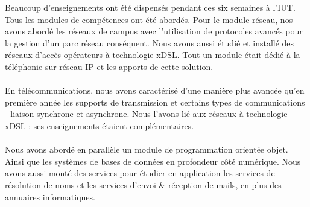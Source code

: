 \begin{resumo}
    Beaucoup d'enseignements ont été dispensés pendant ces six semaines à l'IUT. Tous les modules de compétences ont été abordés. Pour le module réseau, nos avons abordé les réseaux de campus avec l'utilisation de protocoles avancés pour la gestion d'un parc réseau conséquent. Nous avons aussi étudié et installé des réseaux d'accès opérateurs à technologie xDSL. Tout un module était dédié à la téléphonie sur réseau IP et les apports de cette solution.
    \\ \\
    En télécommunications, nous avons caractérisé d'une manière plus avancée qu'en première année les supports de transmission et certains types de communications - liaison synchrone et asynchrone. Nous l'avons lié aux réseaux à technologie xDSL : ses enseignements étaient complémentaires.
    \\ \\
    Nous avons abordé en parallèle un module de programmation orientée objet. Ainsi que les systèmes de bases de données en profondeur côté numérique. Nous avons aussi monté des services pour étudier en application les services de résolution de noms et les services d'envoi \& réception de mails, en plus des annuaires informatiques.
    
\end{resumo}
